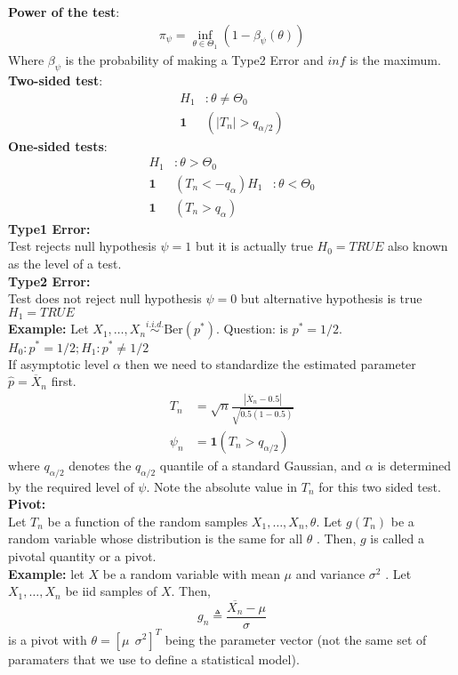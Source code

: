 \textbf{Power of the test}:\\
\begin{align*}
\pi_\psi = \inf_{\theta \in \Theta_1}(1 - \beta_\psi(\theta))
\end{align*}
Where $\beta_\psi$ is the probability of making a Type2 Error and $inf$ is the maximum.\\
\textbf{Two-sided test}:
\begin{align*}
H_1&: \theta \neq \Theta_0\\
\mathbf{1}&(|T_ n| > q_{\alpha /2})
\end{align*}
\textbf{One-sided tests}:
\begin{align*}
H_1&: \theta > \Theta_0\\
\mathbf{1}&(T_ n < -q_{\alpha})
H_1&: \theta < \Theta_0\\
\mathbf{1}&(T_ n > q_{\alpha})
\end{align*}
\textbf{Type1 Error:}\\
Test rejects null hypothesis $\psi = 1$ but it is actually true $H_0 = TRUE$ also known as the level of a test.\\
\textbf{Type2 Error:}\\
Test does not reject null hypothesis $\psi = 0$ but alternative hypothesis is true $H_1 = TRUE$\\
\textbf{Example:} Let $X_1, \ldots , X_ n \stackrel{i.i.d.}{\sim } \text {Ber}(p^*)$. Question: is $p^* = 1/2$.\\
$H_0: p^* = 1/2; H_1:p^* \neq 1/2$\\
If asymptotic level $\alpha$ then we need to standardize the estimated parameter $\hat{p} = \overline{X}_ n$ first.\\
\begin{align*}
T_n &= \sqrt{n}\frac{\left| \overline{X}_ n - 0.5\right|}{\sqrt{0.5(1 - 0.5)}}\\
\displaystyle \psi _{n} &= \displaystyle \mathbf{1}\left(T_n>q_{\alpha /2} \right)
\end{align*}
where $q_{\alpha /2}$ denotes the $q_{\alpha /2}$ quantile of a standard Gaussian, and $\alpha$ is determined by the required level of $\psi$. Note the absolute value in $T_n$ for this two sided test.\\
\textbf{Pivot:}\\
Let $T_n$ be a function of the random samples $X_1,\dots ,X_ n,\theta$. Let $g(T_ n)$ be a random variable whose distribution is the same for all $\theta$ . Then, $g$ is called a pivotal quantity or a pivot.\\
\textbf{Example:} let $X$ be a random variable with mean $\mu$ and variance $\sigma^2$ . Let $X_1,\dots ,X_ n$ be iid samples of $X$. Then,
\[\displaystyle  g_ n \triangleq \frac{\overline{X_ n} - \mu }{\sigma }\]
is a pivot with $\theta = \left[\mu ~ ~  \sigma ^2\right]^ T$ being the parameter vector (not the same set of paramaters that we use to define a statistical model).
